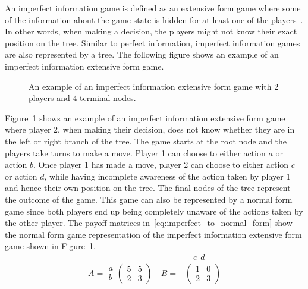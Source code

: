 An imperfect information game is defined as an extensive form game where some
of the information about the game state is hidden for at least one of the
players~\cite{Berwanger2008}.
In other words, when making a decision, the players might not know their exact
position on the tree.
Similar to perfect information, imperfect information games are also represented
by a tree.
The following figure shows an example of an imperfect information extensive
form game.

\begin{figure}[H]
    \centering
    
    \caption{An example of an imperfect information extensive form game with
    \(2\) players and \(4\) terminal nodes.}
    \label{fig:imperfect_extensive_form_game}
\end{figure}

Figure~\ref{fig:imperfect_extensive_form_game} shows an example of an imperfect
information extensive form game where player 2, when making their decision,
does not know whether they are in the left or right branch of the tree.
The game starts at the root node and the players take turns to make a move.
Player 1 can choose to either action \(a\) or action \(b\).
Once player 1 has made a move, player 2 can choose to either action \(c\) or
action \(d\), while having incomplete awareness of the action taken by player 1
and hence their own position on the tree.
The final nodes of the tree represent the outcome of the game.
This game can also be represented by a normal form game since both players end
up being completely unaware of the actions taken by the other player.
The payoff matrices in~\eqref{eq:imperfect_to_normal_form} show the normal form
game representation of the imperfect information extensive form game shown in
Figure~\ref{fig:imperfect_extensive_form_game}.
\begin{align}\label{eq:imperfect_to_normal_form}
    & \quad c \ \ d \nonumber \\
    A =
    \begin{matrix}
        a \\
        b
    \end{matrix}
    \begin{pmatrix}
        5 & 5 \\
        2 & 3
    \end{pmatrix} \quad
    B =&
    \begin{pmatrix}
        1 & 0 \\
        2 & 3
    \end{pmatrix}
\end{align}
